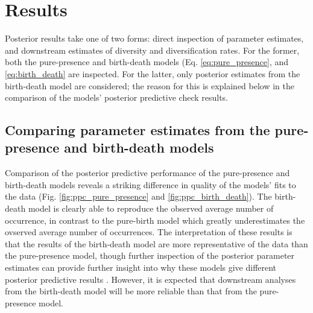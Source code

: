 \documentclass[12pt,letterpaper]{article}
\begin{document}
\section*{Results}

Posterior results take one of two forms: direct inspection of parameter estimates, and downstream estimates of diversity and diversification rates. For the former, both the pure-presence and birth-death models (Eq. \ref{eq:pure_presence}, and \ref{eq:birth_death} are inspected. For the latter, only posterior estimates from the birth-death model are considered; the reason for this is explained below in the comparison of the models' posterior predictive check results.

\subsection*{Comparing parameter estimates from the pure-presence and birth-death models}


Comparison of the posterior predictive performance of the pure-presence and birth-death models reveals a striking difference in quality of the models' fits to the data (Fig. \ref{fig:ppc_pure_presence} and \ref{fig:ppc_birth_death}). The birth-death model is clearly able to reproduce the observed average number of occurrence, in contrast to the pure-birth model which greatly underestimates the ovserved average number of occurrences. The interpretation of these results is that the results of the birth-death model are more representative of the data than the pure-presence model, though further inspection of the posterior parameter estimates can provide further insight into why these models give different posterior predictive results \citep{Gelman2013d}. However, it is expected that downstream analyses from the birth-death model will be more reliable than that from the pure-presence model.
\end{document}
